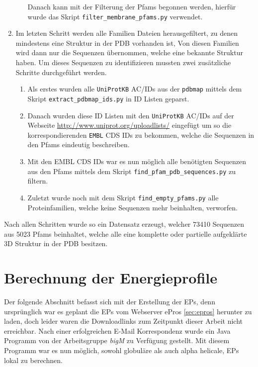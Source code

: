 \begin{enumerate}
\begin{enumerate}
        Danach kann mit der Filterung der \ac{Pfams} begonnen werden, hierfür wurde das Skript \texttt{filter\_membrane\_pfams.py} verwendet.
    \end{enumerate}
\item
    Im letzten Schritt werden alle Familien Dateien herausgefiltert, zu denen mindestens eine Struktur in der \ac{PDB} vorhanden ist, Von diesen Familien wird dann nur die Sequenzen übernommen, welche eine bekannte Struktur haben. Um dieses Sequenzen zu identifizieren mussten zwei zusätzliche Schritte durchgeführt werden.
    \begin{enumerate}
        \item
        Als erstes wurden alle \texttt{UniProtKB} AC/IDs aus der \texttt{pdbmap} mittels dem Skript \texttt{extract\_pdbmap\_ids.py} in ID Listen geparst. 
        \item
        Danach wurden diese ID Listen mit den \texttt{UniProtKB} AC/IDs auf der Webseite \url{http://www.uniprot.org/uploadlists/} eingefügt um so die korrespondierenden \texttt{EMBL} CDS IDs zu bekommen, welche die Sequenzen in den Pfams eindeutig beschreiben.
        \item
        Mit den EMBL CDS IDs war es nun möglich alle benötigten Sequenzen aus den Pfams mittels dem Skript \texttt{find\-\_pfam\-\_pdb\-\_sequences.py} zu filtern.
        \item
        Zuletzt wurde noch mit dem Skript \texttt{find\-\_empty\-\_pfams.py} alle Proteinfamilien, welche keine Sequenzen mehr beinhalten, verworfen. 
    \end{enumerate}
\end{enumerate}

Nach allen Schritten wurde so ein Datensatz erzeugt, welcher 73410 Sequenzen aus 5023 \ac{Pfams} beinhaltet, welche alle eine komplette oder partielle aufgeklärte 3D Struktur in der \ac{PDB} besitzen.




\section{Berechnung der Energieprofile}
\label{sec:calc_ep}
Der folgende Abschnitt befasst sich mit der Erstellung der \ac{EP}s, denn ursprünglich war es geplant die \ac{EP}s vom Webserver ePros \ref{sec:epros} herunter zu laden, doch leider waren die Downloadlinks zum Zeitpunkt dieser Arbeit nicht erreichbar. Nach einer erfolgreichen E-Mail Korrespondenz wurde ein Java Programm von der Arbeitsgruppe \emph{bigM} zu Verfügung gestellt. Mit diesem Programm war es nun möglich, sowohl globuläre als auch alpha helicale, \ac{EP}s lokal zu berechnen. 

